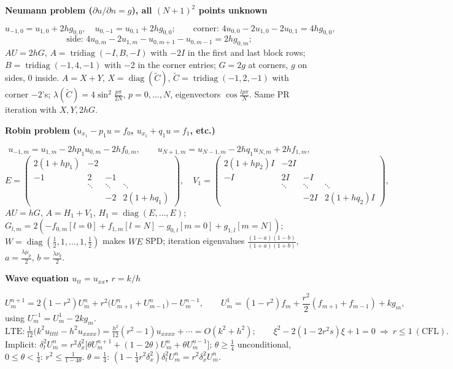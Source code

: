 \documentclass[10pt,a4paper]{article}
\newcommand{\head}[1]{\par\smallskip\noindent\textbf{\color{blue!50!black}#1}\par\nobreak}
\begin{document}
\head{Neumann problem (\(\partial u/\partial n=g\)), all \((N+1)^2\) points unknown}
\[
  u_{-1,0}=u_{1,0}+2hg_{0,0},\quad u_{0,-1}=u_{0,1}+2hg_{0,0};\qquad
  \text{corner: } 4u_{0,0}-2u_{1,0}-2u_{0,1}=4hg_{0,0},
\]
\[
  \text{side: } 4u_{0,m}-2u_{1,m}-u_{0,m+1}-u_{0,m-1}=2hg_{0,m};
\]
\(AU=2hG\), \(A=\operatorname{tridiag}(-I,B,-I)\) with \(-2I\) in the first and last block rows;
\(B=\operatorname{tridiag}(-1,4,-1)\) with \(-2\) in the corner entries;
\(G=2g\) at corners, \(g\) on sides, \(0\) inside.\;
\(A=X+Y\), \(X=\operatorname{diag}(\tilde C)\), \(\tilde C=\operatorname{tridiag}(-1,2,-1)\) with corner \(-2\)'s;
\(\lambda(\tilde C)=4\sin^2\frac{p\pi}{2N}\), \(p=0,\dots,N\), eigenvectors \(\cos\frac{lp\pi}N\).
Same PR iteration with \(X,Y,2hG\).

\head{Robin problem (\(u_{x_1}-p_1u=f_0\), \(u_{x_1}+q_1u=f_1\), etc.)}
\[
  u_{-1,m}=u_{1,m}-2hp_1u_{0,m}-2hf_{0,m},\qquad
  u_{N+1,m}=u_{N-1,m}-2hq_1u_{N,m}+2hf_{1,m},
\]
\[
  E=\begin{pmatrix}2(1+hp_1)&-2&&\\-1&2&-1&\\&\ddots&\ddots&\ddots\\&&-2&2(1+hq_1)\end{pmatrix},\quad
  V_1=\begin{pmatrix}2(1+hp_2)I&-2I&&\\-I&2I&-I&\\&\ddots&\ddots&\ddots\\&&-2I&2(1+hq_2)I\end{pmatrix},
\]
\(AU=hG\), \(A=H_1+V_1\), \(H_1=\operatorname{diag}(E,\dots,E)\);
\(G_{l,m}=2(-f_{0,m}[l{=}0]+f_{1,m}[l{=}N]-g_{0,l}[m{=}0]+g_{1,l}[m{=}N])\);
\(W=\operatorname{diag}(\frac12,1,\dots,1,\frac12)\) makes \(WE\) SPD;
iteration eigenvalues \(\frac{(1-a)(1-b)}{(1+a)(1+b)}\), \(a=\frac{\lambda\mu_p}2\), \(b=\frac{\lambda\nu_q}2\).

\head{Wave equation \(u_{tt}=u_{xx}\), \(r=k/h\)}
\[
  U_m^{n+1}=2(1-r^2)U_m^n+r^2\bigl(U_{m+1}^n+U_{m-1}^n\bigr)-U_m^{n-1},
  \qquad
  U_m^1=(1-r^2)f_m+\frac{r^2}2(f_{m+1}+f_{m-1})+kg_m,
\]
using \(U_m^{-1}=U_m^1-2kg_m\).
\[
  \text{LTE}: \tfrac1{12}\bigl(k^2u_{tttt}-h^2u_{xxxx}\bigr)=\tfrac{h^2}{12}(r^2-1)u_{xxxx}+\cdots=O(k^2+h^2);
  \qquad
  \xi^2-2(1-2r^2s)\xi+1=0\ \Rightarrow\ r\le1\ (\text{CFL}).
\]
Implicit:
\(\delta_t^2U_m^n=r^2\delta_x^2\bigl[\theta U_m^{n+1}+(1-2\theta)U_m^n+\theta U_m^{n-1}\bigr]\);
\(\theta\ge\frac14\) unconditional, \(0\le\theta<\frac14\): \(r^2\le\frac1{1-4\theta}\).
\(\theta=\frac14\): \((1-\frac14r^2\delta_x^2)\delta_t^2U_m^n=r^2\delta_x^2U_m^n\).
\end{document}
